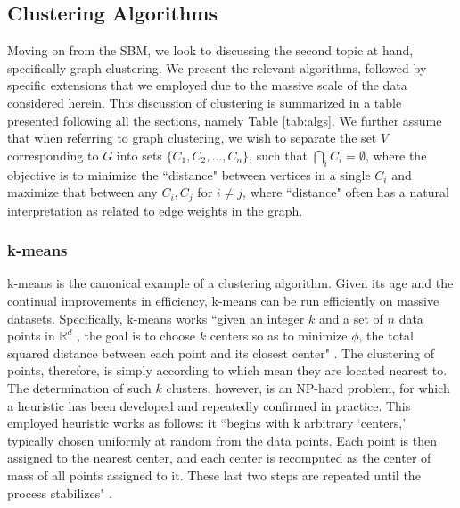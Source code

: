 \documentclass{article}
\begin{document}
\subsection{Clustering Algorithms}
Moving on from the SBM, we look to discussing the second topic at hand, specifically graph clustering. We present the relevant algorithms, followed by specific extensions that we employed due to the massive scale of the data considered herein. This discussion of clustering is summarized in a table presented following all the sections, namely Table \ref{tab:algs}. We further assume that when referring to graph clustering, we wish to separate the set $V$ corresponding to $G$ into sets $\{C_1, C_2, ..., C_n\}$, such that $\bigcap_{i} C_{i} = \emptyset$, where the objective is to minimize the ``distance" between vertices in a single $C_i$ and maximize that between any $C_i,C_j$ for $i\neq j$, where ``distance" often has a natural interpretation as related to edge weights in the graph. 

\subsubsection{k-means}
k-means is the canonical example of a clustering algorithm. Given its age and the continual improvements in efficiency, k-means can be run efficiently on massive datasets. Specifically, k-means works ``given an integer $k$ and a set of $n$ data points in $\mathbb{R}^d$ , the goal is to choose $k$ centers so as to minimize $\phi$, the total squared distance between each point and its closest center" \cite{k-means}. The clustering of points, therefore, is simply according to which mean they are located nearest to. The determination of such $k$ clusters, however, is an NP-hard problem, for which a heuristic has been developed and repeatedly confirmed in practice. This employed heuristic works as follows: it ``begins with k arbitrary `centers,' typically chosen uniformly at random from the data points. Each point is then assigned to the nearest center, and each center is recomputed as the center of mass of all points assigned to it. These last two steps are repeated until the process stabilizes" \cite{k-means}. 
\end{document}
